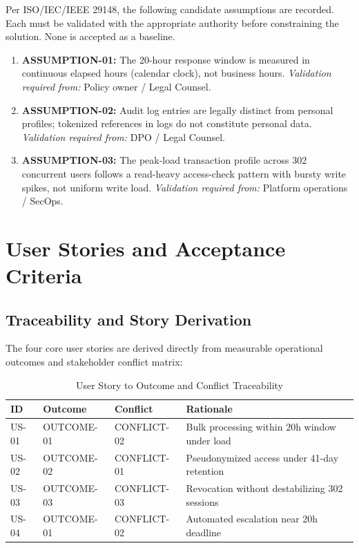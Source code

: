 \documentclass[10pt,a4paper]{article}
\begin{document}
Per ISO/IEC/IEEE 29148, the following candidate assumptions are recorded. Each must be validated with the appropriate authority before constraining the solution. None is accepted as a baseline.

\begin{enumerate}[leftmargin=*]
 \item \textbf{ASSUMPTION-01:} The 20-hour response window is measured in continuous elapsed hours (calendar clock), not business hours. \textit{Validation required from:} Policy owner / Legal Counsel.
 \item \textbf{ASSUMPTION-02:} Audit log entries are legally distinct from personal profiles; tokenized references in logs do not constitute personal data. \textit{Validation required from:} DPO / Legal Counsel.
 \item \textbf{ASSUMPTION-03:} The peak-load transaction profile across 302 concurrent users follows a read-heavy access-check pattern with bursty write spikes, not uniform write load. \textit{Validation required from:} Platform operations / SecOps.
\end{enumerate}

\section{User Stories and Acceptance Criteria}

\subsection{Traceability and Story Derivation}

The four core user stories are derived directly from measurable operational outcomes and stakeholder conflict matrix:

\begin{table}[h]
\centering
\small
\begin{tabularx}{\textwidth}{|l|l|l|X|}
\hline
\textbf{ID} & \textbf{Outcome} & \textbf{Conflict} & \textbf{Rationale} \\
\hline
US-01 & OUTCOME-01 & CONFLICT-02 & Bulk processing within 20h window under load \\
\hline
US-02 & OUTCOME-02 & CONFLICT-01 & Pseudonymized access under 41-day retention \\
\hline
US-03 & OUTCOME-03 & CONFLICT-03 & Revocation without destabilizing 302 sessions \\
\hline
US-04 & OUTCOME-01 & CONFLICT-02 & Automated escalation near 20h deadline \\
\hline
\end{tabularx}
\caption{User Story to Outcome and Conflict Traceability}
\end{table}
\end{document}
